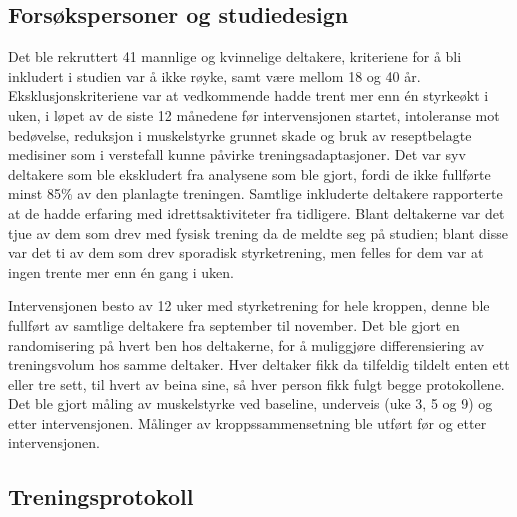 \documentclass[
  letterpaper,
  DIV=11,
  numbers=noendperiod]{scrreprt}
\begin{document}
\subsection{Forsøkspersoner og
studiedesign}\label{forsuxf8kspersoner-og-studiedesign}

Det ble rekruttert 41 mannlige og kvinnelige deltakere, kriteriene for å
bli inkludert i studien var å ikke røyke, samt være mellom 18 og 40 år.
Eksklusjonskriteriene var at vedkommende hadde trent mer enn én
styrkeøkt i uken, i løpet av de siste 12 månedene før intervensjonen
startet, intoleranse mot bedøvelse, reduksjon i muskelstyrke grunnet
skade og bruk av reseptbelagte medisiner som i verstefall kunne påvirke
treningsadaptasjoner. Det var syv deltakere som ble ekskludert fra
analysene som ble gjort, fordi de ikke fullførte minst 85\% av den
planlagte treningen. Samtlige inkluderte deltakere rapporterte at de
hadde erfaring med idrettsaktiviteter fra tidligere. Blant deltakerne
var det tjue av dem som drev med fysisk trening da de meldte seg på
studien; blant disse var det ti av dem som drev sporadisk styrketrening,
men felles for dem var at ingen trente mer enn én gang i uken.

Intervensjonen besto av 12 uker med styrketrening for hele kroppen,
denne ble fullført av samtlige deltakere fra september til november. Det
ble gjort en randomisering på hvert ben hos deltakerne, for å muliggjøre
differensiering av treningsvolum hos samme deltaker. Hver deltaker fikk
da tilfeldig tildelt enten ett eller tre sett, til hvert av beina sine,
så hver person fikk fulgt begge protokollene. Det ble gjort måling av
muskelstyrke ved baseline, underveis (uke 3, 5 og 9) og etter
intervensjonen. Målinger av kroppssammensetning ble utført før og etter
intervensjonen.

\subsection{Treningsprotokoll}\label{treningsprotokoll}
\end{document}
